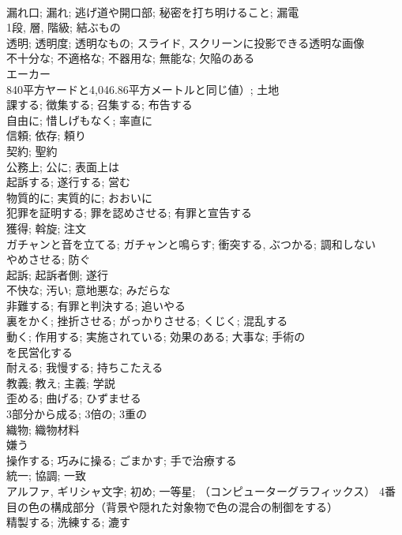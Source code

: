\documentclass[8pt]{extreport}
\begin{document}
\begin{CJK}{UTF8}{min}
\\	漏れ口; 漏れ; 逃げ道や開口部; 秘密を打ち明けること; 漏電	
\\	1段, 層, 階級; 結ぶもの	
\\	透明; 透明度; 透明なもの; スライド, スクリーンに投影できる透明な画像	
\\	不十分な; 不適格な; 不器用な; 無能な; 欠陥のある	
\\	エーカー
\\	840平方ヤードと4,046.86平方メートルと同じ値）; 土地	
\\	課する; 徴集する; 召集する; 布告する	
\\	自由に; 惜しげもなく; 率直に	
\\	信頼; 依存; 頼り	
\\	契約; 聖約	
\\	公務上; 公に; 表面上は	
\\	起訴する; 遂行する; 営む	
\\	物質的に; 実質的に; おおいに	
\\	犯罪を証明する; 罪を認めさせる; 有罪と宣告する	
\\	獲得; 斡旋; 注文	
\\	ガチャンと音を立てる; ガチャンと鳴らす; 衝突する, ぶつかる; 調和しない	
\\	やめさせる; 防ぐ	
\\	起訴; 起訴者側; 遂行	
\\	不快な; 汚い; 意地悪な; みだらな	
\\	非難する; 有罪と判決する; 追いやる	
\\	裏をかく; 挫折させる; がっかりさせる; くじく; 混乱する	
\\	動く; 作用する; 実施されている; 効果のある; 大事な; 手術の	
\\	を民営化する	
\\	耐える; 我慢する; 持ちこたえる	
\\	教義; 教え; 主義; 学説	
\\	歪める; 曲げる; ひずませる	
\\	3部分から成る; 3倍の; 3重の	
\\	織物; 織物材料	
\\	嫌う	
\\	操作する; 巧みに操る; ごまかす; 手で治療する	
\\	統一; 協調; 一致	
\\	アルファ, ギリシャ文字; 初め; 一等星; （コンピューターグラフィックス） 4番目の色の構成部分（背景や隠れた対象物で色の混合の制御をする）	
\\	精製する; 洗練する; 漉す	

\end{CJK}
\end{document}
